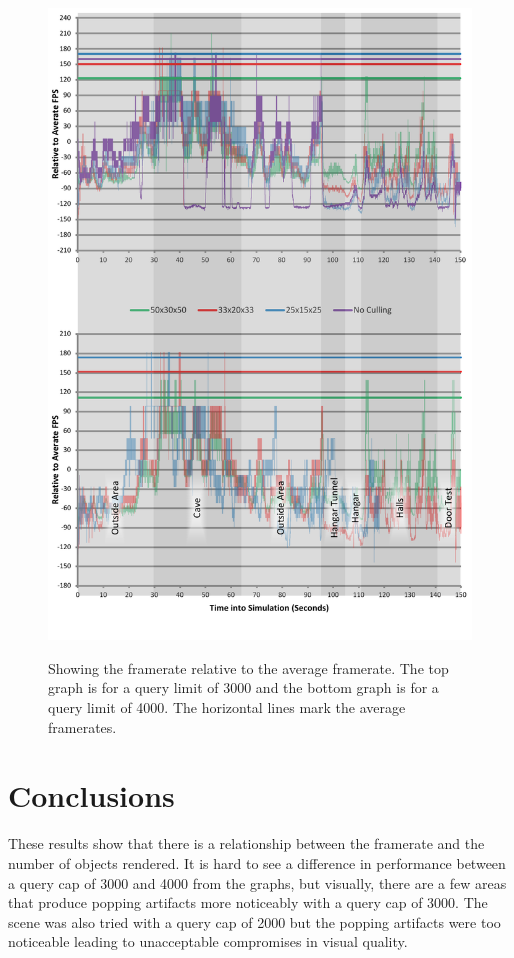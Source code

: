 \documentclass[12pt]{ucthesis}
\newcommand{\captionfonts}{\small\bf\ssp}
\begin{document}
\begin{figure}
\begin{center}
\includegraphics[width=\textwidth]{Images/Graphs/AverageRelative.pdf}
\label{fig:average-relative}
\captionfonts
\caption[Framerate Relative To Average]{Showing the framerate relative to the average framerate.  The top graph is for a query limit of 3000 and the bottom graph is for a query limit of 4000.  The horizontal lines mark the average framerates.}
\end{center}
\end{figure}

\section{Conclusions}
\label{conclusions}
These results show that there is a relationship between the framerate and the number of objects rendered.
It is hard to see a difference in performance between a query cap of 3000 and 4000 from the graphs, but visually, there are a few areas that produce popping artifacts more noticeably with a query cap of 3000.
The scene was also tried with a query cap of 2000 but the popping artifacts were too noticeable leading to unacceptable compromises in visual quality.
\end{document}
